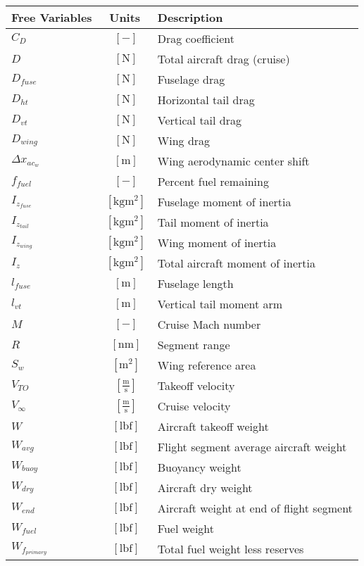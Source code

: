 \documentclass[12pt]{article}
\begin{document}
{\footnotesize
\begin{supertabular}{lcl}
\toprule
Free Variables & Units & Description \\ \midrule
$C_D$ & $~[-]$ & Drag coefficient \\
$D$ & $~\mathrm{[N]}$ & Total aircraft drag (cruise) \\
$D_{fuse}$ & $~\mathrm{[N]}$ & Fuselage drag \\
$D_{ht}$ & $~\mathrm{[N]}$ & Horizontal tail drag \\
$D_{vt}$ & $~\mathrm{[N]}$ & Vertical tail drag \\
$D_{wing}$ & $~\mathrm{[N]}$ & Wing drag \\
$\Delta x_{ac_w}$ & $~\mathrm{[m]}$ & Wing aerodynamic center shift \\
$f_{fuel}$ & $~\mathrm{[-]}$ & Percent fuel remaining \\
$I_{z_{fuse}}$ & $~\mathrm{[kg m^2]}$ & Fuselage moment of inertia\\
$I_{z_{tail}}$ & $~\mathrm{[kg m^2]}$ & Tail moment of inertia\\
$I_{z_{wing}}$ & $~\mathrm{[kg m^2]}$ & Wing moment of inertia\\
$I_{z}$ & $~\mathrm{[kg m^2]}$ & Total aircraft moment of inertia\\
$l_{fuse}$ & $~\mathrm{[m]}$ & Fuselage length \\
$l_{vt}$ & $~\mathrm{[m]}$ & Vertical tail moment arm \\
$M$ & $~[-]$ & Cruise Mach number \\
$R$ & $~\mathrm{[nm]}$ & Segment range\\
$S_w$ & $~\mathrm{[m^{2}]}$ & Wing reference area \\
$V_{TO}$ & $~\mathrm{[\tfrac{m}{s}]}$ & Takeoff velocity \\
$V_{\infty}$ & $~\mathrm{[\tfrac{m}{s}]}$ & Cruise velocity \\
$W$ & $~\mathrm{[lbf]}$ & Aircraft takeoff weight \\
$W_{avg}$ & $~\mathrm{[lbf]}$ & Flight segment average aircraft weight\\
$W_{buoy}$ & $~\mathrm{[lbf]}$ & Buoyancy weight \\
$W_{dry}$ & $~\mathrm{[lbf]}$ & Aircraft dry weight\\
$W_{end}$ & $~\mathrm{[lbf]}$ & Aircraft weight at end of flight segment\\
$W_{fuel}$ & $~\mathrm{[lbf]}$ & Fuel weight \\
$W_{f_{primary}}$ & $~\mathrm{[lbf]}$ & Total fuel weight less reserves\\

\end{supertabular}}
\end{document}
